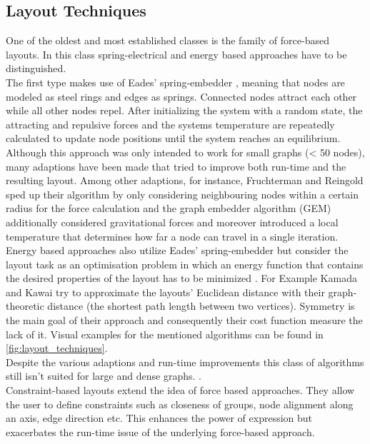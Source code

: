 \subsection{Layout Techniques}
One of the oldest and most established classes is the family of force-based layouts. In this class spring-electrical and energy based approaches have to be distinguished.\\ 
The first type makes use of Eades' spring-embedder \cite{Gibson2013}, meaning that nodes are modeled as steel rings and edges as springs. Connected nodes attract each other while all other nodes repel. After initializing the system with a random state, the attracting and repulsive forces and the systems temperature are repeatedly calculated to update node positions until the system reaches an equilibrium. Although this approach was only intended to work for small graphs (< 50 nodes), many adaptions have been made that tried to improve both run-time and the resulting layout. Among other adaptions, for instance, Fruchterman and Reingold\cite{not accesible!} sped up their algorithm by only considering neighbouring nodes within a certain radius for the force calculation and the graph embedder algorithm (GEM) additionally considered gravitational forces and moreover introduced a local temperature that determines how far a node can travel in a single iteration.\\
Energy based approaches also utilize Eades' spring-embedder but consider the layout task as an optimisation problem in which an energy function that contains the desired properties of the layout has to be minimized \cite{Gibson2013}. For Example Kamada and Kawai \cite{Kamada1989} try to approximate the layouts' Euclidean distance with their graph-theoretic distance (the shortest path length between two vertices). Symmetry is the main goal of their approach and consequently their cost function measure the lack of it.
Visual examples for the mentioned algorithms can be found in \autoref{fig:layout_techniques}.\\
Despite the various adaptions and run-time improvements this class of algorithms still isn't suited for large and dense graphs.\cite{Gibson2013} \cite{VonLandesberger2011}.
\\
Constraint-based layouts extend the idea of force based approaches. They allow the user to define constraints such as closeness of groups, node alignment along an axis, edge direction etc. This enhances the power of expression but exacerbates the run-time issue of the underlying force-based approach\cite{VonLandesberger2011}.


